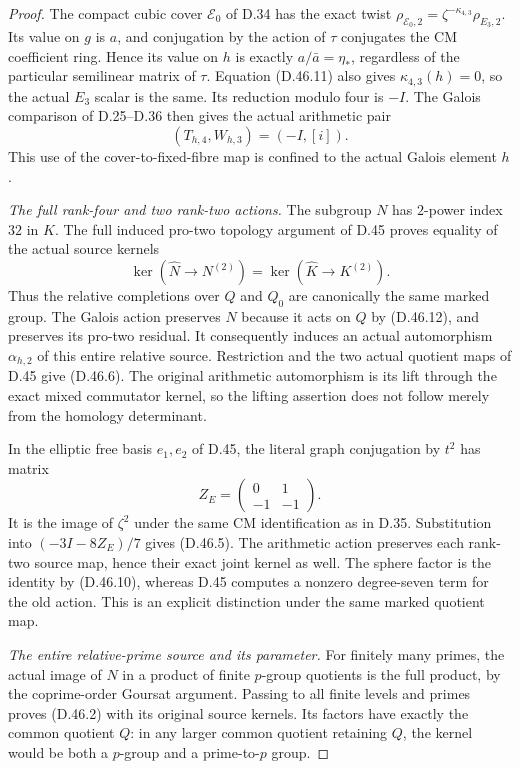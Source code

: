 \begin{proof}
The compact cubic cover
\(\mathcal E_0\) of D.34 has
the exact twist
\(\rho_{\mathcal E_0,2}
=\zeta^{-\kappa_{4,3}}\rho_{E_3,2}\).
Its value on \(g\) is \(a\),
and conjugation by the
action of \(\tau\) conjugates
the CM coefficient ring.
Hence its value on \(h\)
is exactly \(a/\bar a=\eta_*\),
regardless of the particular
semilinear matrix of \(\tau\).
Equation (D.46.11) also gives
\(\kappa_{4,3}(h)=0\), so the
actual \(E_3\) scalar is the
same. Its reduction modulo
four is \(-I\).
The Galois comparison of
D.25--D.36 then gives
the actual arithmetic pair
\[
                         (T_{h,4},W_{h,3})=(-I,[i]).          \tag{D.46.13}
\]
This use of the cover-to-fixed-fibre
map is confined to the actual
Galois element \(h\).

\emph{The full rank-four and two rank-two actions.}
The subgroup \(N\) has
\(2\)-power index \(32\)
in \(K\). The full induced
pro-two topology argument
of D.45 proves equality
of the actual source kernels
\[
 \ker(\widehat N\to N^{(2)})
                =\ker(\widehat K\to K^{(2)}).                 \tag{D.46.14}
\]
Thus the relative completions
over \(Q\) and \(Q_0\) are
canonically the same marked
group. The Galois action
preserves \(N\) because it
acts on \(Q\) by (D.46.12),
and preserves its pro-two
residual. It consequently
induces an actual automorphism
\(\alpha_{h,2}\) of this
entire relative source.
Restriction and the two
actual quotient maps of
D.45 give (D.46.6).
The original arithmetic
automorphism is its lift
through the exact mixed
commutator kernel, so the
lifting assertion does not
follow merely from the
homology determinant.

In the elliptic free basis
\(e_1,e_2\) of D.45, the
literal graph conjugation
by \(t^2\) has matrix
\[
                      Z_E=\begin{pmatrix}0&1\\-1&-1\end{pmatrix}.
                                                               \tag{D.46.15}
\]
It is the image of
\(\zeta^2\) under the
same CM identification as
in D.35. Substitution into
\((-3I-8Z_E)/7\) gives
(D.46.5). The arithmetic
action preserves each
rank-two source map, hence
their exact joint kernel
as well. The sphere factor
is the identity by
(D.46.10), whereas
D.45 computes a nonzero
degree-seven term for the
old action. This is an
explicit distinction under
the same marked quotient
map.

\emph{The entire relative-prime source and its parameter.}
For finitely many primes,
the actual image of \(N\)
in a product of finite
\(p\)-group quotients is
the full product, by the
coprime-order Goursat
argument. Passing to all
finite levels and primes
proves (D.46.2) with its
original source kernels.
Its factors have exactly
the common quotient \(Q\):
in any larger common
quotient retaining \(Q\),
the kernel would be both
a \(p\)-group and a
prime-to-\(p\) group.


\end{proof}
